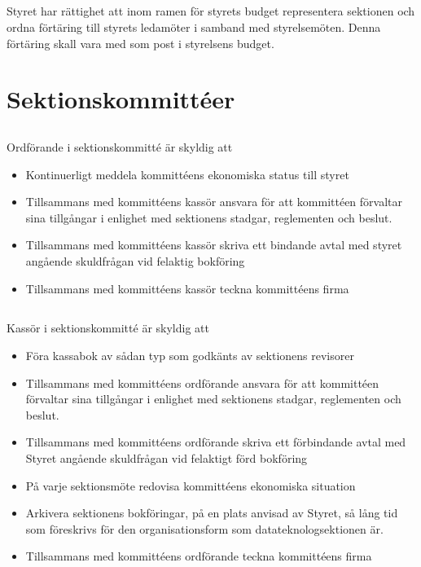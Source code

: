\documentclass[a4paper, 10pt]{article}
\begin{document}
\subsection{}
Styret har rättighet att inom ramen för styrets budget representera sektionen och ordna förtäring till styrets ledamöter i samband med styrelsemöten. Denna förtäring skall vara med som post i styrelsens budget.

\section{Sektionskommittéer}
\label{sec:sektionsforeningar}
\subsection{}
Ordförande i sektionskommitté är skyldig att
\begin{itemize}
\item Kontinuerligt meddela kommittéens ekonomiska status till styret
\item Tillsammans med kommittéens kassör ansvara för att kommittéen förvaltar sina tillgångar i enlighet med sektionens stadgar, reglementen och beslut.
\item Tillsammans med kommittéens kassör skriva ett bindande avtal med
styret angående skuldfrågan vid felaktig bokföring
\item Tillsammans med kommittéens kassör teckna kommittéens firma
\end{itemize}
\subsection{}
Kassör i sektionskommitté är skyldig att
\begin{itemize}
\item Föra kassabok av sådan typ som godkänts av sektionens revisorer
\item Tillsammans med kommittéens ordförande ansvara för att kommittéen förvaltar sina tillgångar i enlighet med sektionens stadgar, reglementen och beslut.
\item Tillsammans med kommittéens ordförande skriva ett förbindande avtal med Styret angående skuldfrågan vid felaktigt förd bokföring
\item På varje sektionsmöte redovisa kommittéens ekonomiska situation
\item Arkivera sektionens bokföringar, på en plats anvisad av Styret, så lång tid som föreskrivs för den organisationsform som datateknologsektionen är.
\item Tillsammans med kommittéens ordförande teckna kommittéens firma
\end{itemize}
\end{document}
